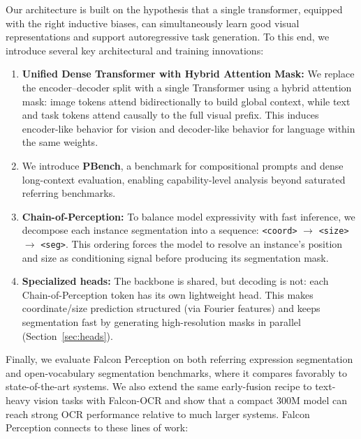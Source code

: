 \noindent Our architecture is built on the hypothesis that a single transformer, equipped with the right inductive biases, can simultaneously learn good visual representations and support autoregressive task generation. To this end, we introduce several key architectural and training innovations:

\begin{enumerate}
    \item \textbf{Unified Dense Transformer with Hybrid Attention Mask:} We replace the encoder--decoder split with a single Transformer using a hybrid attention mask: image tokens attend bidirectionally to build global context, while text and task tokens attend causally to the full visual prefix. This induces encoder-like behavior for vision and decoder-like behavior for language within the same weights.

    \item We introduce \textbf{PBench}, a benchmark for compositional prompts and dense long-context evaluation, enabling capability-level analysis beyond saturated referring benchmarks.


    \item \textbf{Chain-of-Perception:} To balance model expressivity with fast inference, we decompose each instance segmentation into a sequence: \texttt{<coord>} $\rightarrow$ \texttt{<size>} $\rightarrow$ \texttt{<seg>}. This ordering forces the model to resolve an instance's position and size as conditioning signal before producing its segmentation mask.
    
    \item \textbf{Specialized heads:} The backbone is shared, but decoding is not: each Chain-of-Perception token has its own lightweight head. This makes coordinate/size prediction structured (via Fourier features) and keeps segmentation fast by generating high-resolution masks in parallel (Section~\ref{sec:heads}).
    
\end{enumerate}

\noindent Finally, we evaluate Falcon Perception on both referring expression segmentation and open-vocabulary segmentation benchmarks, where it compares favorably to state-of-the-art systems. We also extend the same early-fusion recipe to text-heavy vision tasks with Falcon-OCR and show that a compact 300M model can reach strong OCR performance relative to much larger systems. Falcon Perception connects to these lines of work:

